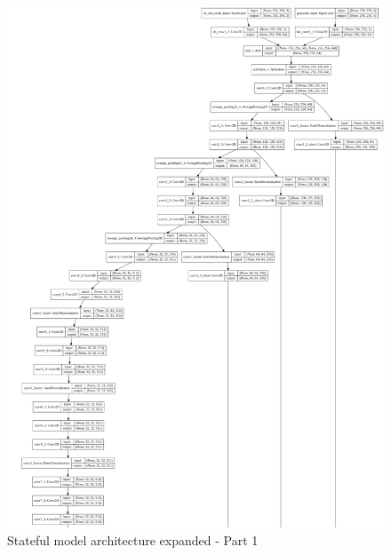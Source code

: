 \documentclass[12pt,openright,oneside,a4paper,english]{abntex2}
\begin{document}
\begin{otherlanguage}{english}
    \begin{figure}[!htb]
    \centering
    \includegraphics[height=\textheight]{model_plot/Stateful1}
    \caption{Stateful model architecture expanded - Part 1}
    \label{stateful_plot_1}
    \end{figure}


\end{otherlanguage}
\end{document}
